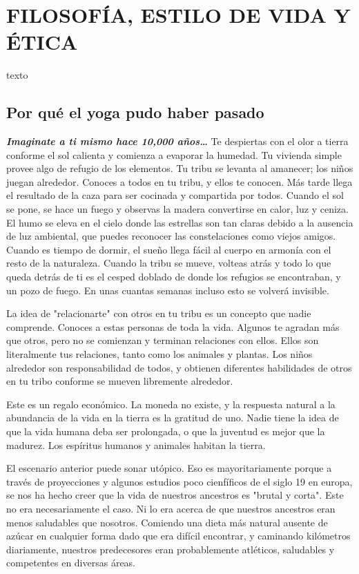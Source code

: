 \chapter{FILOSOFÍA, ESTILO DE VIDA Y ÉTICA}
texto
\section{Por qué el yoga pudo haber pasado}
\textbf{\textit{Imaginate a ti mismo hace 10,000 años\ldots}}
Te despiertas con el olor a tierra conforme el sol calienta y comienza a evaporar la humedad. Tu vivienda simple provee algo de refugio de los elementos. Tu tribu se levanta al amanecer; los niños juegan alrededor. Conoces a todos en tu tribu, y ellos te conocen. Más tarde llega el resultado de la caza para ser cocinada y compartida por todos. Cuando el sol se pone, se hace un fuego y observas la madera convertirse en calor, luz y ceniza. El humo se eleva en el cielo donde las estrellas son tan claras debido a la ausencia de luz ambiental, que puedes reconocer las constelaciones como viejos amigos. Cuando es tiempo de dormir, el sueño llega fácil al cuerpo en armonía con el resto de la naturaleza. Cuando la tribu se mueve, volteas atrás y todo lo que queda detrás de ti es el cesped doblado de donde los refugios se encontraban, y un pozo de fuego. En unas cuantas semanas incluso esto se volverá invisible.

La idea de "relacionarte" con otros en tu tribu es un concepto que nadie comprende. Conoces a estas personas de toda la vida. Algunos te agradan más que otros, pero no se comienzan y terminan relaciones con ellos. Ellos son literalmente tus relaciones, tanto como los animales y plantas. Los niños alrededor son responsabilidad de todos, y obtienen diferentes habilidades de otros en tu tribo conforme se mueven libremente alrededor.

Este es un regalo económico. La moneda no existe, y la respuesta natural a la abundancia de la vida en la tierra es la gratitud de uno. Nadie tiene la idea de que la vida humana deba ser prolongada, o que la juventud es mejor que la madurez. Los espíritus humanos y animales habitan la tierra.

El escenario anterior puede sonar utópico. Eso es mayoritariamente porque a trav\'es de proyecciones y algunos estudios poco cienfíficos de el siglo 19 en europa, se nos ha hecho creer que la vida de nuestros ancestros es "brutal y corta". Este no era necesariamente el caso. Ni lo era acerca de que nuestros ancestros eran menos saludables que nosotros. Comiendo una dieta más natural ausente de azúcar en cualquier forma dado que era difícil encontrar, y caminando kilómetros diariamente, nuestros predecesores eran probablemente atléticos, saludables y competentes en diversas áreas.

